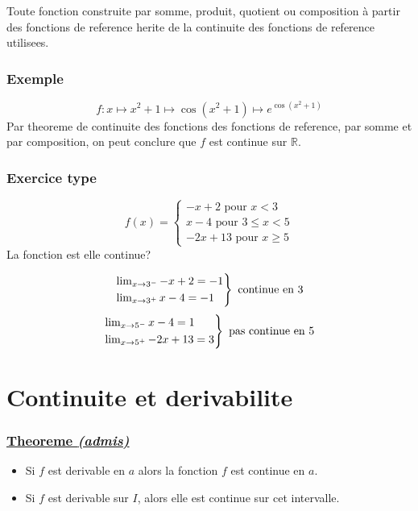\documentclass{article}
\begin{document}
	Toute fonction construite par somme, produit, quotient ou composition à partir des fonctions de reference herite de la continuite des fonctions de reference utilisees.\\

	\subsubsection*{Exemple}
	$$ f:x \mapsto x^2+1 \mapsto \cos (x^2+1) \mapsto e^{\cos (x^2+1)} $$
	Par theoreme de continuite des fonctions des fonctions de reference, par somme et par composition, on peut conclure que $f$ est continue sur $\mathbb{R}$. \\ 
	\subsubsection*{Exercice type}
	$$f(x) = 
	\begin{cases}
		-x+2 \text{ pour } x < 3\\
		x - 4 \text{ pour } 3 \leq x < 5 \\
		-2x+13 \text{ pour } x\geq 5
	\end{cases}
	$$
	La fonction est elle continue?
	
	$$ 	\begin{rcases*}
			\lim_{x \to 3^{-}} -x+2 = -1	\\
			\lim_{x \to 3^{+}} x-4 = -1 \\
		\end{rcases*} \text{ continue en 3}
	$$
	$$
		\begin{rcases*}
			\lim_{x \to 5^{-}} x-4  = 1 \\
			\lim_{x \to 5^{+}} -2x+13 = 3
		\end{rcases*} \text{ pas continue en 5}
	$$
\section{Continuite et derivabilite}
\begin{defbox}
	\sloppy
	\subsubsection*{\underline{Theoreme \textit{(admis)}}}
	\begin{itemize}
		\item Si $f$ est derivable en $a$ alors la fonction $f$ est continue en $a$.
		\item Si $f$ est derivable sur $I$, alors elle est continue sur cet intervalle.
	\end{itemize}
\end{defbox}
\end{document}
